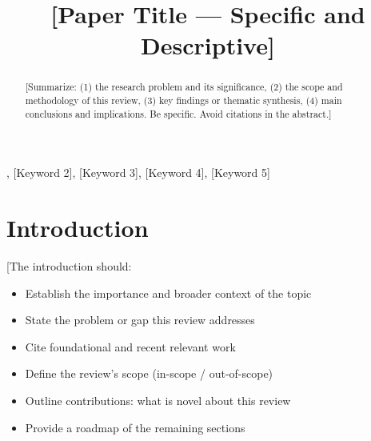 \documentclass[conference]{IEEEtran}
\begin{document}
\title{[Paper Title — Specific and Descriptive]}

\author{
}

\maketitle

\begin{IEEEkeywords}
[Keyword 1], [Keyword 2], [Keyword 3], [Keyword 4], [Keyword 5]
\end{IEEEkeywords}

\begin{abstract}
[Summarize: (1) the research problem and its significance,
(2) the scope and methodology of this review,
(3) key findings or thematic synthesis,
(4) main conclusions and implications.
Be specific. Avoid citations in the abstract.]
\end{abstract}

\section{Introduction}
[The introduction should:
\begin{itemize}
    \item Establish the importance and broader context of the topic
    \item State the problem or gap this review addresses
    \item Cite foundational and recent relevant work \cite{key1,key2}
    \item Define the review's scope (in-scope / out-of-scope)
    \item Outline contributions: what is novel about this review
    \item Provide a roadmap of the remaining sections
\end{itemize}
\end{document}
